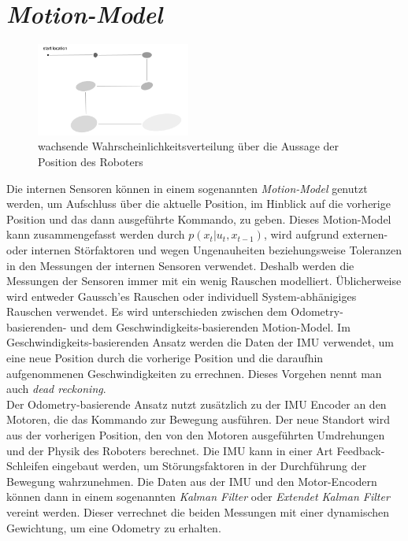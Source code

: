 \section{\textit{Motion-Model}}\label{sec:Motion-Model}
\begin{figure}
    \centering
    \includegraphics[width=0.45\textwidth]{pic/vorwissen/3b_growinguncertainty.png}
    \caption{wachsende Wahrscheinlichkeitsverteilung über die Aussage der Position des Roboters}
    \label{fig:3b_growing_uncertainty}
\end{figure}
Die internen Sensoren können in einem sogenannten \textit{Motion-Model} \cite{youtube:motion_model} genutzt werden, um Aufschluss über die aktuelle Position, im Hinblick auf die vorherige Position und das dann ausgeführte Kommando, zu geben. Dieses Motion-Model kann zusammengefasst werden durch $p(x_t|u_t, x_{t-1})$, wird aufgrund externen- oder internen Störfaktoren und wegen Ungenauheiten beziehungsweise Toleranzen in den Messungen der internen Sensoren verwendet. Deshalb werden die Messungen der Sensoren immer mit ein wenig Rauschen modelliert. Üblicherweise wird entweder Gaussch'es Rauschen oder individuell System-abhänigiges Rauschen verwendet. Es wird unterschieden zwischen dem Odometry-basierenden- und dem Geschwindigkeits-basierenden Motion-Model. Im Geschwindigkeits-basierenden Ansatz werden die Daten der IMU verwendet, um eine neue Position durch die vorherige Position und die daraufhin aufgenommenen Geschwindigkeiten zu errechnen. Dieses Vorgehen nennt man auch \textit{dead reckoning}.\\
Der Odometry-basierende Ansatz nutzt zusätzlich zu der IMU Encoder an den Motoren, die das Kommando zur Bewegung ausführen. Der neue Standort wird aus der vorherigen Position, den von den Motoren ausgeführten Umdrehungen und der Physik des Roboters berechnet. Die IMU kann in einer Art Feedback-Schleifen eingebaut werden, um Störungsfaktoren in der Durchführung der Bewegung wahrzunehmen. Die Daten aus der IMU und den Motor-Encodern können dann in einem sogenannten \textit{Kalman Filter} oder \textit{Extendet Kalman Filter} vereint werden. Dieser verrechnet die beiden Messungen mit einer dynamischen Gewichtung, um eine Odometry zu erhalten.\\
